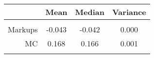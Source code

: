 \begin{tabular}{r|ccc}
 & Mean & Median & Variance \\\hline &&& \\ 
 Markups   & -0.043 & -0.042 & 0.000 \\ 
 MC        & 0.168 & 0.166 & 0.001 \\ 
 &&& \\\hline 
\end{tabular}